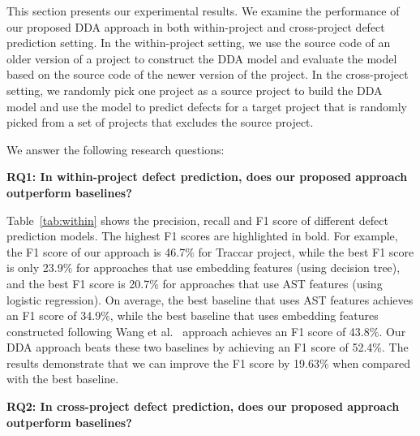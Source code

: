 This section presents our experimental results. We examine the performance of our proposed DDA approach in both within-project and cross-project defect prediction setting. In the within-project setting, we use the source code of an older version of a project to construct the DDA model and evaluate the model based on the source code of the newer version of the project. In the cross-project setting, we randomly pick one project as a source project to build the DDA model and use the model to predict defects for a target project that is randomly picked from a set of projects that excludes the source project.

We answer the following research questions: 

\textbf{RQ1: In within-project defect prediction, does our proposed approach outperform baselines?}

Table~\ref{tab:within} shows the precision, recall and F1 score of different defect prediction models. The highest F1 scores are highlighted in bold. For example, the F1 score of our approach is 46.7\% for Traccar project, while the best F1 score is only 23.9\% for approaches that use embedding features (using decision tree), and the best F1 score is 20.7\% for approaches that use AST features (using logistic regression). On average, the best baseline that uses AST features achieves an F1 score of 34.9\%, while the best baseline that uses embedding features constructed following Wang et al.~\cite{wang2016automatically} approach achieves an F1 score of 43.8\%. Our DDA approach beats these two baselines by achieving an F1 score of 52.4\%. The results demonstrate that we can improve the F1 score by 19.63\% when compared with the best baseline. 


\textbf{RQ2: In cross-project defect prediction, does our proposed approach outperform baselines?}

